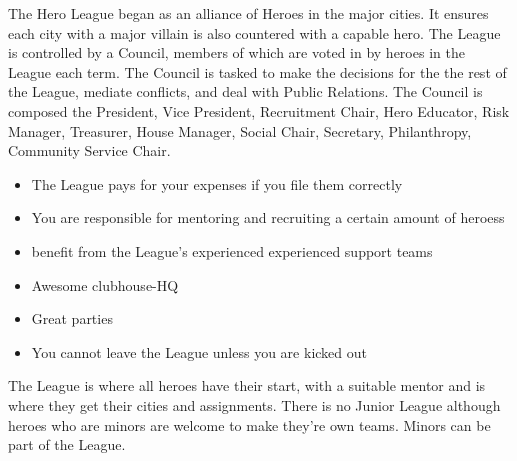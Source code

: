 \documentclass[blue]{LRSguildcamp1}
\begin{document}
\name{\bHeroLeague{}}


The Hero League began as an alliance of Heroes in the major cities. It ensures each city with a major villain is also countered with a capable hero. The League is controlled by a Council, members of which are voted in by heroes in the League each term. The Council is tasked to make the decisions for the the rest of the League, mediate conflicts, and deal with Public Relations. The Council is composed the President, Vice President, Recruitment Chair, Hero Educator, Risk Manager, Treasurer, House Manager, Social Chair, Secretary, Philanthropy, Community Service Chair. 

\begin{itemize}
\item The League pays for your expenses if you file them correctly 
\item You are responsible for mentoring and recruiting a certain amount of heroess
\item benefit from the League's experienced experienced support teams
\item Awesome clubhouse-HQ
\item Great parties
\item You cannot leave the League unless you are kicked out
\end{itemize}

The League is where all heroes have their start, with a suitable mentor and is where they get their cities and assignments. There is no Junior League although heroes who are minors are welcome to make they're own teams. Minors can be part of the League. 
\end{document}
